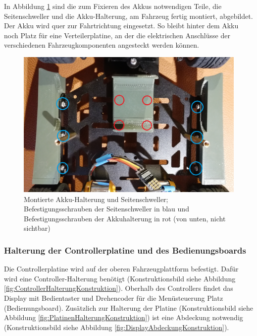 In Abbildung \ref{fig:SchwellerAkkuHalterungMontage} sind die zum Fixieren des Akkus notwendigen Teile, die Seitenschweller und die Akku-Halterung, am Fahrzeug fertig montiert, abgebildet. Der Akku wird quer zur Fahrtrichtung eingesetzt. So bleibt hinter dem Akku noch Platz für eine Verteilerplatine, an der die elektrischen Anschlüsse der verschiedenen Fahrzeugkomponenten angesteckt werden können.

\begin{figure}[H] %
\includegraphics[width=.7\textwidth]{sec2/images/3DAnbaukomponenten/Montagebilder/SchwellerAkkuHalterungMontage} 
\centering
\captionsetup{width=.95\textwidth}
\caption[Montierte Akku-Halterung und Seitenschweller]{Montierte Akku-Halterung und Seitenschweller; Befestigungsschrauben der Seitenschweller in blau und Befestigungsschrauben der Akkuhalterung in rot (von unten, nicht sichtbar)}\centering
\label{fig:SchwellerAkkuHalterungMontage}
\end{figure}

\newpage

\subsubsection{Halterung der Controllerplatine und des Bedienungsboards}\label{Sec2Sub2SubSub3}

Die Controllerplatine wird auf der oberen Fahrzeugplattform befestigt. Dafür wird eine Controller-Halterung benötigt (Konstruktionsbild siehe Abbildung \ref{fig:ControllerHalterungKonstruktion}). Oberhalb des Controllers findet das Display mit Bedientaster und Drehencoder für die Menüsteuerung Platz (Bedienungsboard). Zusätzlich zur Halterung der Platine (Konstruktionsbild siehe Abbildung \ref{fig:PlatinenHalterungKonstruktion}) ist eine Abdeckung notwendig (Konstruktionsbild siehe Abbildung \ref{fig:DisplayAbdeckungKonstruktion}).

